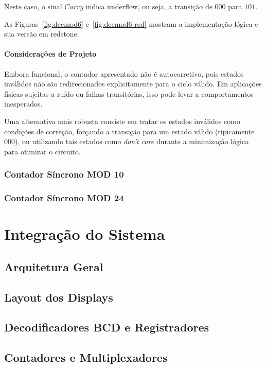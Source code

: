 \documentclass[a4paper,12pt]{article}
\begin{document}
Neste caso, o sinal $Carry$ indica underflow, ou seja, a transição de $000$ para $101$.

As Figuras~\ref{fig:decmod6} e~\ref{fig:decmod6-red} mostram a implementação lógica e sua versão em redstone.

\paragraph{Considerações de Projeto}

Embora funcional, o contador apresentado não é autocorretivo, pois estados inválidos não são redirecionados explicitamente para o ciclo válido. Em aplicações físicas sujeitas a ruído ou falhas transitórias, isso pode levar a comportamentos inesperados.

Uma alternativa mais robusta consiste em tratar os estados inválidos como condições de correção, forçando a transição para um estado válido (tipicamente $000$), ou utilizando tais estados como \textit{don't care} durante a minimização lógica para otimizar o circuito.

\subsubsection{Contador Síncrono MOD 10}

\subsubsection{Contador Síncrono MOD 24}

\newpage

\section{Integração do Sistema}

\subsection{Arquitetura Geral}
\subsection{Layout dos Displays}
\subsection{Decodificadores BCD e Registradores}
\subsection{Contadores e Multiplexadores}
\end{document}
